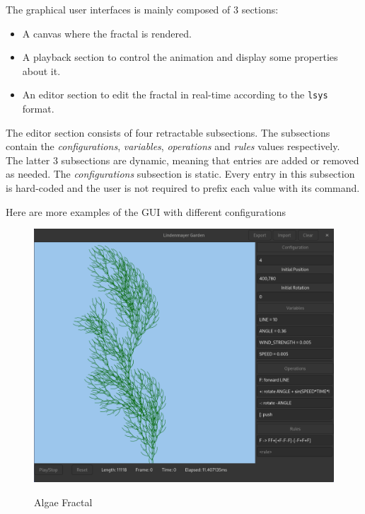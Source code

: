 \documentclass[a4paper]{article}
\begin{document}
The graphical user interfaces is mainly composed of 3 sections:
\begin{itemize}
    \item A canvas where the fractal is rendered.
    \item A playback section to control the animation and display some properties about it.
    \item An editor section to edit the fractal in real-time according to the \texttt{lsys} format.
\end{itemize}

The editor section consists of four retractable subsections.
The subsections contain the \textit{configurations}, \textit{variables}, \textit{operations}
and \textit{rules} values respectively. \\
The latter 3 subsections are dynamic, meaning that entries are added or removed as needed.
The \textit{configurations} subsection is static. Every entry in this subsection is hard-coded
and the user is not required to prefix each value with its command.

\pagebreak

Here are more examples of the \gls{GUI} with different configurations


\begin{figure}[h]
    \includegraphics[width=\textwidth]{media/gui/gui-algae.png}
    \label{fig:algae}
    \caption{Algae Fractal}
\end{figure}
\end{document}
